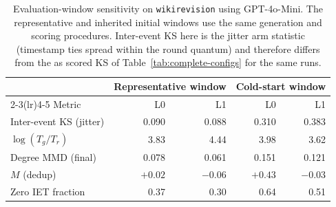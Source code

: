\begin{table}[h]
\caption{Evaluation-window sensitivity on \texttt{wikirevision} using GPT-4o-Mini. The representative and inherited initial windows use the same generation and scoring procedures. Inter-event KS here is the jitter arm statistic (timestamp ties spread within the round quantum) and therefore differs from the as scored KS of Table~\ref{tab:complete-configs} for the same runs.}
\label{tab:window-sensitivity}
\centering\small
\begin{tabular}{lrrrr}
\toprule
 & \multicolumn{2}{c}{Representative window} & \multicolumn{2}{c}{Cold-start window} \\
\cmidrule(lr){2-3}\cmidrule(lr){4-5}
Metric & L0 & L1 & L0 & L1 \\
\midrule
Inter-event KS (jitter) & 0.090 & 0.088 & 0.310 & 0.383 \\
$\log(T_g/T_r)$ & 3.83 & 4.44 & 3.98 & 3.62 \\
Degree MMD (final) & 0.078 & 0.061 & 0.151 & 0.121 \\
$M$ (dedup) & $+0.02$ & $-0.06$ & $+0.43$ & $-0.03$ \\
Zero IET fraction & 0.37 & 0.30 & 0.64 & 0.51 \\
\bottomrule
\end{tabular}
\end{table}
